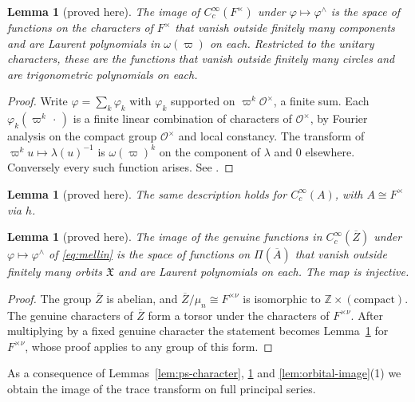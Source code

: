 \documentclass[12pt,letterpaper]{article}
\numberwithin{equation}{section}
\newtheorem{lemma}[theorem]{Lemma}
\theoremstyle{definition}
\newcommand{\proved}{proved here}
\newcommand{\Z}{\mathbb Z}
\newcommand{\OF}{\mathcal O}
\newcommand{\vp}{\varpi}
\newcommand{\bA}{\overline{A}}
\newcommand{\bZ}{\overline{Z}}
\newcommand{\fX}{\mathfrak X}
\begin{document}
\begin{lemma}[\proved]\label{lem:PW-Fx}
The image of $C_c^\infty(F^\times)$ under $\varphi\mapsto\varphi^\wedge$ is the space of
functions on the characters of $F^\times$ that vanish outside finitely many components and
are Laurent polynomials in $\omega(\vp)$ on each.  Restricted to the unitary characters,
these are the functions that vanish outside finitely many circles and are trigonometric
polynomials on each.
\end{lemma}
\begin{proof}
Write $\varphi=\sum_{k}\varphi_k$ with $\varphi_k$ supported on $\vp^k\OF^\times$, a finite
sum.  Each $\varphi_k(\vp^k\,\cdot\,)$ is a finite linear combination of characters of
$\OF^\times$, by Fourier analysis on the compact group $\OF^\times$ and local constancy.
The transform of $\vp^ku\mapsto\lambda(u)^{-1}$ is $\omega(\vp)^k$ on the component of
$\lambda$ and $0$ elsewhere.  Conversely every such function arises.  See
\cite[pp.~43--44]{Ta75}.
\end{proof}

\begin{lemma}[\proved]\label{lem:PW-A}
The same description holds for $C_c^\infty(A)$, with $A\cong F^\times$ via $h$.
\end{lemma}

\begin{lemma}[\proved]\label{lem:PW-Z}
The image of the genuine functions in $C_c^\infty(\bZ)$ under
$\varphi\mapsto\varphi^\wedge$ of \eqref{eq:mellin} is the space of functions on $\Pi(\bA)$
that vanish outside finitely many orbits $\fX$ and are Laurent polynomials on each.  The
map is injective.
\end{lemma}
\begin{proof}
The group $\bZ$ is abelian, and $\bZ/\mu_n\cong F^{\times\nu}$ is isomorphic to
$\Z\times(\text{compact})$.  The genuine characters of $\bZ$ form a torsor under the
characters of $F^{\times\nu}$.  After multiplying by a fixed genuine character the
statement becomes Lemma~\ref{lem:PW-Fx} for $F^{\times\nu}$, whose proof applies to any
group of this form.
\end{proof}

As a consequence of Lemmas~\ref{lem:ps-character}, \ref{lem:PW-Z} and
\ref{lem:orbital-image}(1) we obtain the image of the trace transform on full principal
series.
\end{document}
